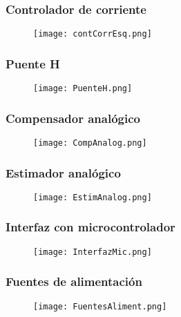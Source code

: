 \subsubsection{Controlador de corriente}
\begin{figure}[H]
	\centering
	\texttt{[image: contCorrEsq.png]}
	\label{fig:contCorrEsq}
\end{figure}

\subsubsection{Puente H}
\begin{figure}[H]
	\centering
	\texttt{[image: PuenteH.png]}
	\label{fig:PuenteH}
\end{figure}

\subsubsection{Compensador analógico}
\begin{figure}[H]
	\centering
	\texttt{[image: CompAnalog.png]}
	\label{fig:CompAnalog}
\end{figure}

\subsubsection{Estimador analógico}
\begin{figure}[H]
	\centering
	\texttt{[image: EstimAnalog.png]}
	\label{fig:EstimAnalog}
\end{figure}

\subsubsection{Interfaz con microcontrolador}
\begin{figure}[H]
	\centering
	\texttt{[image: InterfazMic.png]}
	\label{fig:InterfazMic}
\end{figure}

\subsubsection{Fuentes de alimentación}
\begin{figure}[H]
	\centering
	\texttt{[image: FuentesAliment.png]}
	\label{fig:FuentesAliment}
\end{figure}

